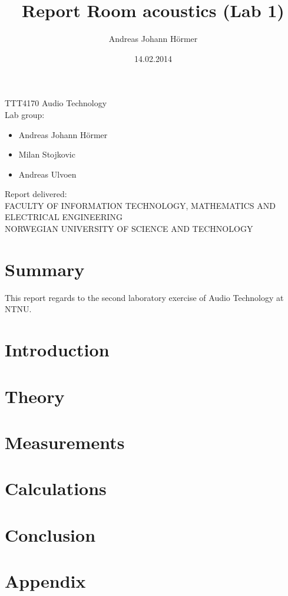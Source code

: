 \documentclass{article}
\title{Report Room acoustics (Lab 1)}
\author{Andreas Johann H\"ormer}
\date{14.02.2014}
\begin{document}
\thispagestyle{empty}
\maketitle
\thispagestyle{empty}
\begin{center}
TTT4170 Audio Technology\\[3cm]
Lab group:
\begin{itemize}
\item Andreas Johann H\"ormer
\item Milan Stojkovic
\item Andreas Ulvoen\\[3cm]
\end{itemize}
Report delivered: \\[6cm]
FACULTY OF INFORMATION TECHNOLOGY, MATHEMATICS AND ELECTRICAL ENGINEERING\\
NORWEGIAN UNIVERSITY OF SCIENCE AND TECHNOLOGY
\end{center}
\thispagestyle{empty}
\tableofcontents
\thispagestyle{empty}
\newpage
\section*{Summary}
\thispagestyle{empty}
This report regards to the second laboratory exercise of Audio Technology at NTNU. 
\newpage
\setcounter{page}{1}
\section{Introduction}

\section{Theory}


\section{Measurements}

\section{Calculations}


\newpage
\section{Conclusion}

\newpage
\section{Appendix}
\end{document}
